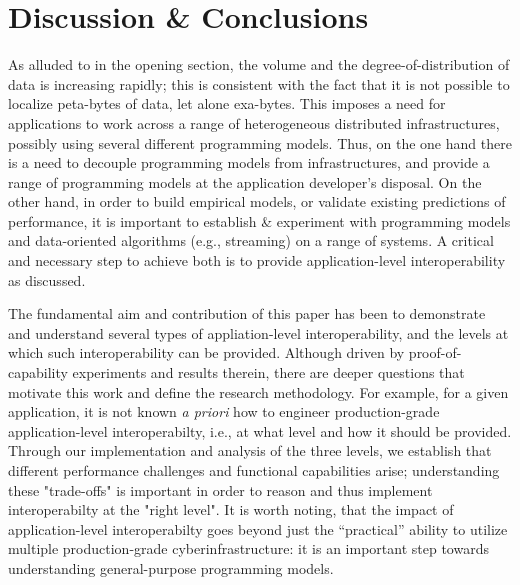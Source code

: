 \documentclass[3p,twocolumn]{elsarticle}
\begin{document}
\section{Discussion \& Conclusions}
\label{sec:discuss}

As alluded to in the opening section, the volume and the
degree-of-distribution of data is increasing rapidly; this is
consistent with the fact that it is not possible to localize
peta-bytes of data, let alone exa-bytes.  This imposes a need for
applications to work across a range of heterogeneous distributed
infrastructures, possibly using several different programming
models. Thus, on the one hand there is a need to decouple programming
models from infrastructures, and provide a range of programming models
at the application developer's disposal. On the other hand, in order
to build empirical models, or validate existing predictions of
performance, it is important to establish \& experiment with
programming models and data-oriented algorithms (e.g., streaming) on a
range of systems.  A critical and necessary step to achieve both is to
provide application-level interoperability as discussed.  

The fundamental aim and contribution of this paper has been to
demonstrate and understand several types of appliation-level
interoperability, and the levels at which such interoperability can be
provided. Although driven by proof-of-capability experiments and
results therein, there are deeper questions that motivate this work
and define the research methodology.  For example, for a given
application, it is not known {\it a priori} how to engineer
production-grade application-level interoperabilty, i.e., at what
level and how it should be provided. Through our implementation and
analysis of the three levels, we establish that different performance
challenges and functional capabilities arise; understanding these
"trade-offs" is important in order to reason and thus implement
interoperabilty at the "right level".  It is worth noting, that the
impact of application-level interoperabilty goes beyond just the
``practical'' ability to utilize multiple production-grade
cyberinfrastructure: it is an important step towards understanding
general-purpose programming models.
\end{document}
